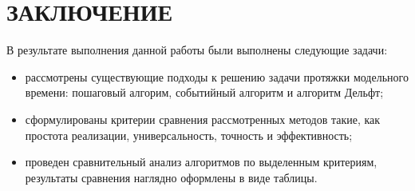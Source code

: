 \chapter*{ЗАКЛЮЧЕНИЕ}

В результате выполнения данной работы были выполнены следующие задачи:
\begin{itemize}
    \item рассмотрены существующие подходы к решению задачи протяжки модельного времени: пошаговый алгорим, событийный алгоритм и алгоритм Дельфт;
    \item сформулированы критерии сравнения рассмотренных методов такие, как простота реализации, универсальность, точность и эффективность;
    \item проведен сравнительный анализ алгоритмов по выделенным критериям, результаты сравнения наглядно оформлены в виде таблицы.
\end{itemize}

